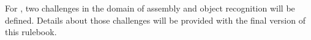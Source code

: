 \documentclass[11pt, twoside, openright, a4paper, chapterprefix]{scrbook}
\begin{document}
For \YEAR, two challenges in the domain of assembly and object recognition will be defined. Details about those challenges will be provided with the final version of this rulebook. 

%


\printabx
\printidx
\end{document}
